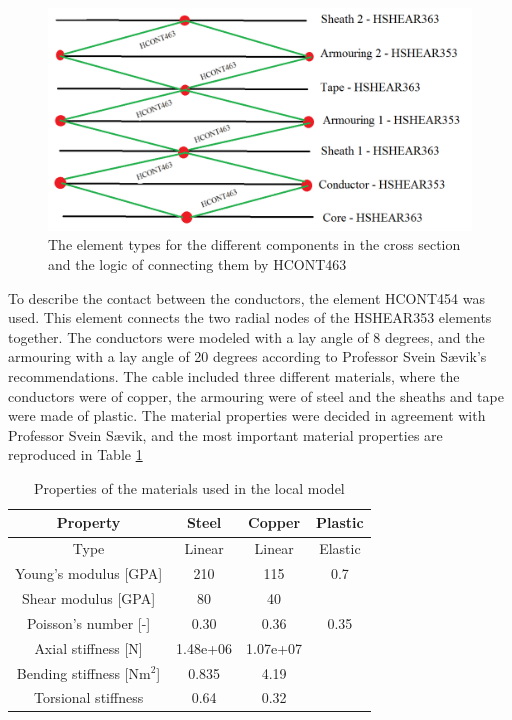 \begin{figure}[H]
\centering
\includegraphics[scale=0.5]{figures/contact}
\caption[$\; \:$ Logic of HCONT463]{The element types for the different components in the cross section and the logic of connecting them by HCONT463}
 \label{fig:contact}
\end{figure}

\noindent To describe the contact between the conductors, the element HCONT454 was used. This element connects the two radial nodes of the HSHEAR353 elements together.\newline
\newline
The conductors were modeled with a lay angle of 8 degrees, and the armouring with a lay angle of 20 degrees according to Professor Svein Sævik's recommendations. \newline
\newline
The cable included three different materials, where the conductors were of copper, the armouring were of steel and the sheaths and tape were made of plastic. The material properties were decided in agreement with Professor Svein Sævik, and the most important material properties are reproduced in Table \ref{table:matprop}
\begin{table} [H]
\centering
\begin{tabular}{ |c|c|c|c|}
\hline
Property &Steel & Copper  & Plastic \\
 \hline
 \hline
Type & Linear & Linear & Elastic\\
Young's modulus [GPA] & 210 & 115 & 0.7\\
Shear modulus [GPA]& 80 & 40 &  \\
Poisson's number [-]& 0.30 & 0.36 & 0.35\\
Axial stiffness [N]& 1.48e+06 & 1.07e+07 & \\
Bending stiffness [Nm$^2$] & 0.835 & 4.19 &\\
Torsional stiffness & 0.64 & 0.32&\\
 \hline
\end{tabular}
\caption{Properties of the materials used in the local model}
\label{table:matprop}
\end{table}


